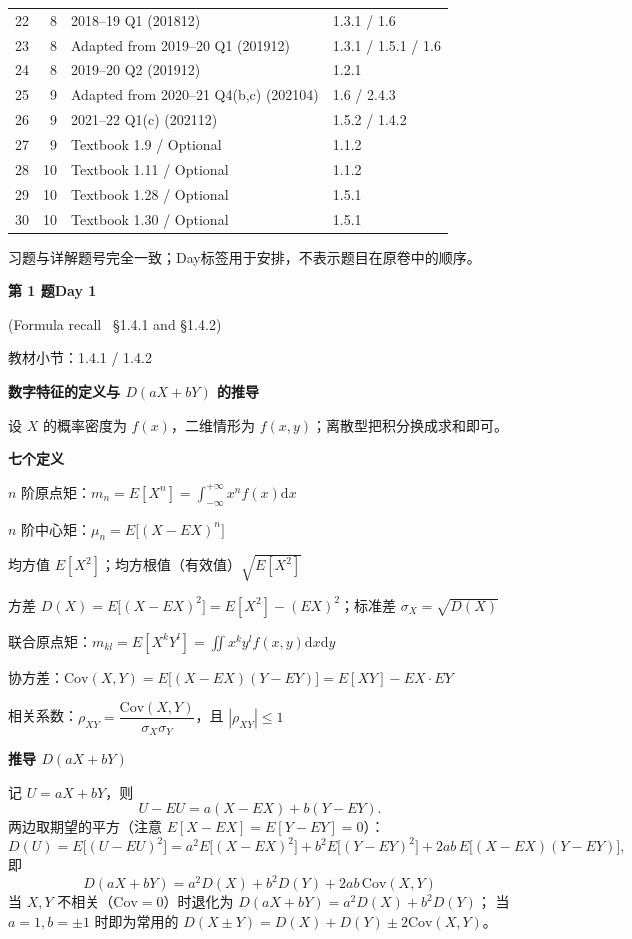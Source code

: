 \documentclass[10.5pt,fontset=fandol]{ctexart}
\newcommand{\key}[1]{\par\vspace{4pt}\noindent\textbf{\color{navy}#1}\par\vspace{2pt}}
\newcommand{\dd}{\mathrm d}\newcommand{\Var}{\operatorname{Var}}\newcommand{\Cov}{\operatorname{Cov}}
\newcommand{\qtitle}[2]{\par\addvspace{1.2em}\Needspace{8\baselineskip}\begin{tcolorbox}[colback=navy,colframe=navy,arc=1.5pt,boxrule=0pt]\color{white}\large\bfseries #1\hfill\small #2\end{tcolorbox}}
\begin{document}
{\begin{xltabular}{\textwidth}{@{}r r L{7cm} X@{}}
22 & 8 & 2018--19 Q1 (201812) & 1.3.1 / 1.6\\
23 & 8 & Adapted from 2019--20 Q1 (201912) & 1.3.1 / 1.5.1 / 1.6\\
24 & 8 & 2019--20 Q2 (201912) & 1.2.1\\
25 & 9 & Adapted from 2020--21 Q4(b,c) (202104) & 1.6 / 2.4.3\\
26 & 9 & 2021--22 Q1(c) (202112) & 1.5.2 / 1.4.2\\
27 & 9 & Textbook 1.9 / Optional & 1.1.2\\
28 & 10 & Textbook 1.11 / Optional & 1.1.2\\
29 & 10 & Textbook 1.28 / Optional & 1.5.1\\
30 & 10 & Textbook 1.30 / Optional & 1.5.1\\
\end{xltabular}}\par\smallskip 习题与详解题号完全一致；Day标签用于安排，不表示题目在原卷中的顺序。\clearpage
\qtitle{第 1 题}{Day 1}
{\small\color{accentred}(Formula recall \textemdash\ \S1.4.1 and \S1.4.2)}\par\smallskip
{\small\color{muted}教材小节：1.4.1 / 1.4.2}\par\medskip
\noindent\textbf{数字特征的定义与 $D(aX{+}bY)$ 的推导}\par\smallskip\begin{tcolorbox}[breakable,colback=qbg,colframe=qbg,boxrule=0pt]设 $X$ 的概率密度为 $f(x)$，二维情形为 $f(x,y)$；离散型把积分换成求和即可。

\key{七个定义}
\begin{qp}
  \item $n$ 阶原点矩：$m_n=E[X^n]=\displaystyle\int_{-\infty}^{+\infty}x^nf(x)\dd x$
  \item $n$ 阶中心矩：$\mu_n=E\big[(X-EX)^n\big]$
  \item 均方值 $E[X^2]$；均方根值（有效值）$\sqrt{E[X^2]}$
  \item 方差 $D(X)=E\big[(X-EX)^2\big]=E[X^2]-(EX)^2$；标准差 $\sigma_X=\sqrt{D(X)}$
  \item 联合原点矩：$m_{kl}=E[X^kY^l]=\displaystyle\iint x^ky^lf(x,y)\dd x\dd y$
  \item 协方差：$\mathrm{Cov}(X,Y)=E\big[(X-EX)(Y-EY)\big]=E[XY]-EX\cdot EY$
  \item 相关系数：$\rho_{XY}=\dfrac{\mathrm{Cov}(X,Y)}{\sigma_X\sigma_Y}$，且 $|\rho_{XY}|\le1$
\end{qp}

\key{推导 $D(aX+bY)$}
记 $U=aX+bY$，则
\[
U-EU=a(X-EX)+b(Y-EY).
\]
两边取期望的平方（注意 $E[X-EX]=E[Y-EY]=0$）：
\[
D(U)=E\big[(U-EU)^2\big]
=a^2E\big[(X-EX)^2\big]+b^2E\big[(Y-EY)^2\big]+2ab\,E\big[(X-EX)(Y-EY)\big],
\]
即
\[
\boxed{\,D(aX+bY)=a^2D(X)+b^2D(Y)+2ab\,\mathrm{Cov}(X,Y)\,}
\]
当 $X,Y$ 不相关（$\mathrm{Cov}=0$）时退化为 $D(aX+bY)=a^2D(X)+b^2D(Y)$；
当 $a=1,b=\pm1$ 时即为常用的 $D(X\pm Y)=D(X)+D(Y)\pm2\mathrm{Cov}(X,Y)$。
\end{tcolorbox}
\end{document}
